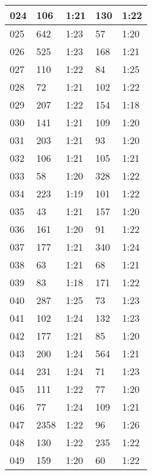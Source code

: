 \begin{center}
\begin{longtable}{|p{2cm}|l|l|l|l|}
024	&   106           &  1:21  &		130     	& 1:22 \\ \hline
025	&   642           &  1:23  &		57      	& 1:20 \\ \hline
026	&   525           &  1:23  &		168     	& 1:21 \\ \hline
027	&   110           &  1:22  &		84      	& 1:25 \\ \hline
028	&   72            &  1:21  &		102     	& 1:22 \\ \hline
029	&   207           &  1:22  &		154     	& 1:18 \\ \hline
030	&   141           &  1:21  &		109     	& 1:20 \\ \hline
031	&   203           &  1:21  &		93      	& 1:20 \\ \hline
032	&   106           &  1:21  &		105     	& 1:21 \\ \hline
033	&   58            &  1:20  &		328     	& 1:22 \\ \hline
034	&   223           &  1:19  &		101     	& 1:22 \\ \hline
035	&   43            &  1:21  &		157     	& 1:20 \\ \hline
036	&   161           &  1:20  &		91      	& 1:22 \\ \hline
037	&   177           &  1:21  &		340     	& 1:24 \\ \hline
038	&   63            &  1:21  &		68      	& 1:21 \\ \hline
039	&   83            &  1:18  &		171     	& 1:22 \\ \hline
040	&   287           &  1:25  &		73      	& 1:23 \\ \hline
041	&   102           &  1:24  &		132     	& 1:23 \\ \hline
042	&   177           &  1:21  &		85      	& 1:20 \\ \hline
043	&   200           &  1:24  &		564     	& 1:21 \\ \hline
044	&   231           &  1:24  &		71      	& 1:23 \\ \hline
045	&   111           &  1:22  &		77      	& 1:20 \\ \hline
046	&   77            &  1:24  &		109     	& 1:21 \\ \hline
047	&   2358          &  1:22  &		96      	& 1:26 \\ \hline
048	&   130           &  1:22  &		235     	& 1:22 \\ \hline
049	&   159           &  1:20  &		60      	& 1:22 \\ \hline

\end{longtable}
\end{center}
